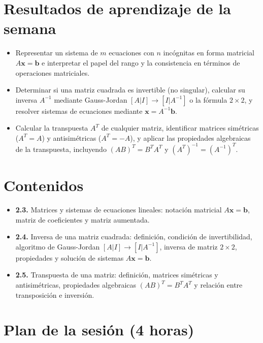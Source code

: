 \documentclass[11pt,letterpaper]{article}
\newcommand{\vv}[1]{\mathbf{#1}}
\begin{document}
\section{Resultados de aprendizaje de la semana}

\begin{itemize}[leftmargin=1.2cm]
  \item[\textbf{RA2.3.}] Representar un sistema de $m$ ecuaciones con $n$ incógnitas en forma
        matricial $A\vv{x}=\vv{b}$ e interpretar el papel del rango y la consistencia en términos
        de operaciones matriciales.
  \item[\textbf{RA2.4.}] Determinar si una matriz cuadrada es invertible (no singular), calcular su
        inversa $A^{-1}$ mediante Gauss-Jordan $[A|I]\to [I|A^{-1}]$ o la fórmula $2\times 2$, y
        resolver sistemas de ecuaciones mediante $\vv{x}=A^{-1}\vv{b}$.
  \item[\textbf{RA2.5.}] Calcular la transpuesta $A^T$ de cualquier matriz, identificar matrices
        simétricas ($A^T=A$) y antisimétricas ($A^T=-A$), y aplicar las propiedades algebraicas
        de la transpuesta, incluyendo $(AB)^T = B^T A^T$ y $(A^T)^{-1} = (A^{-1})^T$.
\end{itemize}

\section{Contenidos}

\begin{itemize}[leftmargin=1.2cm]
  \item \textbf{2.3.} Matrices y sistemas de ecuaciones lineales: notación matricial $A\vv{x}=\vv{b}$,
        matriz de coeficientes y matriz aumentada.
  \item \textbf{2.4.} Inversa de una matriz cuadrada: definición, condición de invertibilidad,
        algoritmo de Gauss-Jordan $[A|I]\to [I|A^{-1}]$, inversa de matriz $2\times 2$, propiedades
        y solución de sistemas $A\vv{x}=\vv{b}$.
  \item \textbf{2.5.} Transpuesta de una matriz: definición, matrices simétricas y antisimétricas,
        propiedades algebraicas $(AB)^T=B^T A^T$ y relación entre transposición e inversión.
\end{itemize}

\section{Plan de la sesión (4 horas)}
\end{document}
